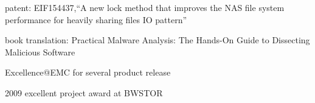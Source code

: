\documentclass{CurriculumVitae} %
\begin{document}
\begin{achievements}
\item patent: EIF154437,“A new lock method that improves the NAS file system performance for heavily sharing files IO pattern”
\item book translation: Practical Malware Analysis: The Hands-On Guide to Dissecting Malicious Software
\item Excellence@EMC for several product release
\item 2009 excellent project award at BWSTOR
\end{achievements}

\newpage
\end{document}
